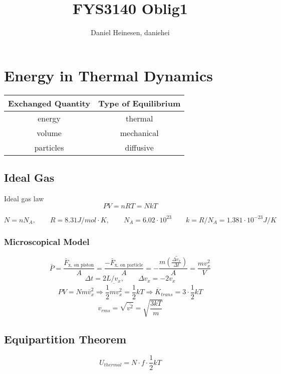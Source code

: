 \documentclass[a4paper,norsk, 10pt]{article}
\title{FYS3140 Oblig1}
\author{Daniel Heinesen, daniehei}
\begin{document}
\section{Energy in Thermal Dynamics}
\begin{table}[H]
\centering
\begin{tabular}{c c}
Exchanged Quantity & Type of Equilibrium\\
\hline
energy & thermal\\
volume & mechanical \\
particles & diffusive
\end{tabular}
\end{table}

\subsection{Ideal Gas}
Ideal gas law
\begin{equation}
PV = nRT = NkT
\end{equation}

\begin{equation}
N = nN_A, \qquad R = 8.31 J/mol\cdot K, \qquad N_A = 6.02\cdot10^{23} \qquad k =  R/N_A = 1.381\cdot 10^{-23} J/K
\end{equation}

\subsubsection{Microscopical Model}
\begin{equation}
\bar{P} = \frac{\bar{F}_{\text{x, on piston}}}{A} = \frac{-\bar{F}_{\text{x, on particle}}}{A} = -\frac{m\bar{\left(\frac{\Delta v_x}{\Delta t}\right)}}{A} = \frac{mv_x^2}{V}
\end{equation}
\begin{equation}
\Delta t = 2L/v_x, \qquad \Delta v_x = -2v_x
\end{equation}
\begin{equation}
PV = Nm\bar{v}_x^2 \Rightarrow \overline{\frac{1}{2}mv_x^2} = \frac{1}{2}kT \Rightarrow \overline{K}_{trans} = 3\cdot\frac{1}{2}kT
\end{equation}
\begin{equation}
v_{rms} = \sqrt{\bar{v^2}} = \sqrt{\frac{3kT}{m}}
\end{equation}
\subsection{Equipartition Theorem}
\begin{equation}
U_{thermal} = N\cdot f\cdot\frac{1}{2}kT
\end{equation}
\end{document}
